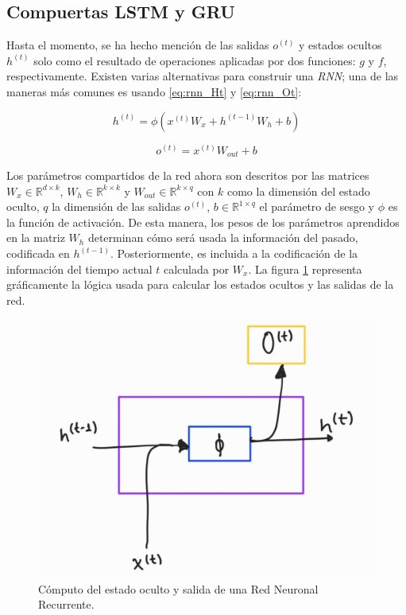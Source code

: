 \subsection{Compuertas LSTM y GRU}

Hasta el momento, se ha hecho mención de las salidas $o^{(t)}$ y estados ocultos $h^{(t)}$ solo como
el resultado de operaciones aplicadas por dos funciones: $g$ y $f$, respectivamente. Existen varias
alternativas para construir una \textit{RNN}; una de las maneras más comunes es usando
\ref{eq:rnn_Ht} y \ref{eq:rnn_Ot}:


\begin{equation}
    h^{(t)} = \phi(x^{(t)} W_{x} + h^{(t-1)} W_h + b)
    \label{eq:rnn_Ht}
\end{equation}

\begin{equation}
    o^{(t)} = x^{(t)} W_{out} + b
    \label{eq:rnn_Ot}
\end{equation}

Los parámetros compartidos de la red ahora son descritos por las matrices
$W_x \in \mathbb{R}^{d \times k}$, $W_h \in \mathbb{R}^{k \times k}$ y
$W_{out} \in \mathbb{R}^{k \times q}$ con $k$ como la dimensión del estado oculto, $q$ la dimensión
de las salidas $o^{(t)}$, $b \in \mathbb{R} ^ {1 \times q}$ el parámetro de sesgo y $\phi$ es la
función de activación. De esta manera, los pesos de los parámetros aprendidos en la matriz $W_h$
determinan cómo será usada la información del pasado, codificada en $h^{(t-1)}$. Posteriormente,
es incluida a la codificación de la información del tiempo actual $t$ calculada por $W_x$.
La figura \ref{fig:rnn_cell} representa gráficamente la lógica usada para calcular los estados
ocultos y las salidas de la red.

\begin{figure}[ht!]
\centering
\includegraphics[width=0.4 \textwidth]{Chapters/2. Transformer/Figures/rnn/rnn_cell.jpg}
\caption{Cómputo del estado oculto y salida de una Red Neuronal Recurrente.}
\label{fig:rnn_cell}
\end{figure}


